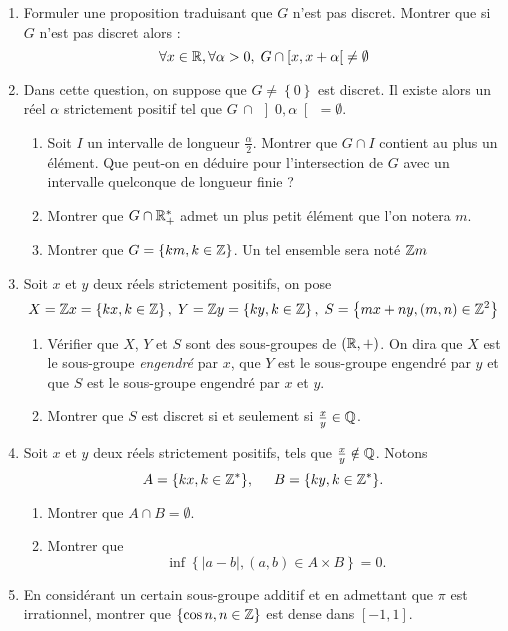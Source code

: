 \begin{enumerate}
  \item Formuler une proposition traduisant que $G$ n'est pas discret. Montrer que si $G$ n'est pas discret alors :
  \[
  \forall x \in \mathbb{R} , \forall \alpha >0 ,\; G\cap \left[ x, x + \alpha \right[ \neq \emptyset
  \]
  \item Dans cette question, on suppose que $G \neq \left\lbrace 0 \right\rbrace$  est discret. Il existe alors un r{\'e}el $\alpha$ strictement positif tel que $G\,\cap\, \left] 0,\alpha \right[ \, = \emptyset$. 
\begin{enumerate}
 \item Soit $I$ un intervalle de longueur $\frac{\alpha}{2}$. Montrer que $G\cap I$ contient au plus un {\'e}l{\'e}ment. Que peut-on en d{\'e}duire pour l'intersection de $G$ avec un intervalle quelconque de longueur finie ?
 \item Montrer que $G\cap\mathbb{R}_+^*$ admet un plus petit {\'e}l{\'e}ment que l'on notera $m$.
 \item Montrer que $G = \left\lbrace  km,k\in\mathbb{Z} \right\rbrace $. Un tel ensemble sera not{\'e} $\mathbb{Z} m$
\end{enumerate}

\item Soit $x$ et $y$ deux r{\'e}els strictement positifs, on pose
  \[
  X = \mathbb{Z} x = \left\lbrace kx,k \in \mathbb{Z} \right\rbrace,\; Y=\mathbb{Z} y = \left\lbrace ky, k\in \mathbb{Z} \right\rbrace,\; S = \left\lbrace mx + ny,(m,n) \in \mathbb{Z}^2 \right\rbrace
  \]
 \begin{enumerate}
 \item V{\'e}rifier que $X$, $Y$ et $S$ sont des sous-groupes de $(\mathbb{R},+)$. On dira que $X$ est le sous-groupe \emph{engendr{\'e}} par $x$, que $Y$ est le sous-groupe engendr{\'e} par $y$ et que $S$ est le sous-groupe engendré par $x$ et $y$.
 \item Montrer que $S$ est discret si et seulement si $\frac{x}{y}\in \mathbb{Q}$.
 \end{enumerate}

\item Soit $x$ et $y$ deux r{\'e}els strictement positifs, tels que $\frac{x}{y}\notin \mathbb{Q}$. Notons
\[
A=\{kx,k \in \mathbb{Z}^*\},\hspace{0.5cm} B=\{ky,k \in \mathbb{Z}^*\}.
\]
 \begin{enumerate}
  \item Montrer que $A\cap B=\emptyset$.
  \item  Montrer que
       \[
       \inf \left\lbrace |a-b|, (a,b)\in A \times B \right\rbrace = 0.
       \]
     \end{enumerate}
\item En consid{\'e}rant un certain sous-groupe additif et en admettant que $\pi$ est irrationnel, montrer que $\{ \cos n , n\in \mathbb{Z}\}$ est dense dans $[-1,1]$.

\end{enumerate}
